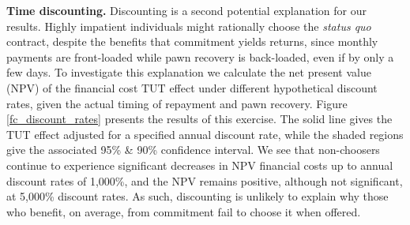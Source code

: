 \documentclass[11pt, a4paper]{article}
\begin{document}


\vspace{.2in}
\noindent \textbf{Time discounting.} Discounting is a second potential explanation for our results. Highly impatient individuals might rationally choose the \emph{status quo} contract, despite the benefits that commitment yields returns, since monthly payments are front-loaded while pawn recovery is back-loaded, even if by only a few days.  
To investigate this explanation we calculate the net present value (NPV) of the financial cost $\text{TUT}$ effect under different hypothetical discount rates, given the actual timing of repayment and pawn recovery. Figure \ref{fc_discount_rates} presents the results of this exercise. 
The solid line gives the TUT effect adjusted for a specified annual discount rate, while the shaded regions give the associated 95\% \& 90\% confidence interval.
We see that non-choosers continue to experience significant decreases in NPV financial costs up to annual discount rates of 1,000\%, and the NPV remains positive, although not significant, at 5,000\% discount rates. As such, discounting is unlikely to explain why those who benefit, on average, from commitment fail to choose it when offered. 
\end{document}
